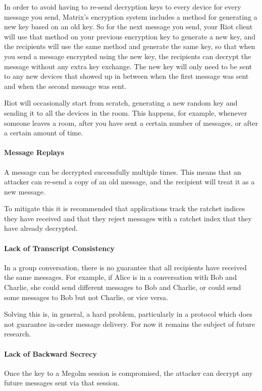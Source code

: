 In order to avoid having to re-send decryption keys to every device for every message you send, Matrix's encryption system includes a method for generating a new key based on an old key. So for the next message you send, your Riot client will use that method on your previous encryption key to generate a new key, and the recipients will use the same method and generate the same key, so that when you send a message encrypted using the new key, the recipients can decrypt the message without any extra key exchange. The new key will only need to be sent to any new devices that showed up in between when the first message was sent and when the second message was sent.

Riot will occasionally start from scratch, generating a new random key and sending it to all the devices in the room. This happens, for example, whenever someone leaves a room, after you have sent a certain number of messages, or after a certain amount of time.

\paragraph{Message Replays}
A message can be decrypted successfully multiple times. This means that an attacker can re-send a copy of an old message, and the recipient will treat it as a new message.

To mitigate this it is recommended that applications track the ratchet indices they have received and that they reject messages with a ratchet index that they have already decrypted.

\paragraph{Lack of Transcript Consistency}
In a group conversation, there is no guarantee that all recipients have received the same messages. For example, if Alice is in a conversation with Bob and Charlie, she could send different messages to Bob and Charlie, or could send some messages to Bob but not Charlie, or vice versa.

Solving this is, in general, a hard problem, particularly in a protocol which does not guarantee in-order message delivery. For now it remains the subject of future research.

\paragraph{Lack of Backward Secrecy}
Once the key to a Megolm session is compromised, the attacker can decrypt any future messages sent via that session.

